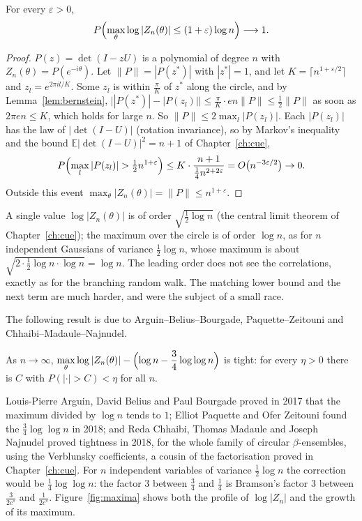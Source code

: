\begin{theorem}\label{thm:maxupper}
For every $\varepsilon>0$,
\[
P\Bigl(\max_\theta\log|Z_n(\theta)|\le(1+\varepsilon)\log n\Bigr)\longrightarrow1 .
\]
\end{theorem}

\begin{proof}
$P(z)=\det(I-zU)$ is a polynomial of degree $n$ with $Z_n(\theta)=P(e^{-i\theta})$. Let $\|P\|=|P(z^*)|$ with $|z^*|=1$, and let $K=\lceil n^{1+\varepsilon/2}\rceil$ and $z_l=e^{2\pi il/K}$. Some $z_l$ is within $\frac\pi K$ of $z^*$ along the circle, and by
Lemma~\ref{lem:bernstein}, $\bigl||P(z^*)|-|P(z_l)|\bigr|\le\frac\pi K\cdot en\|P\|\le\frac12\|P\|$ as soon as $2\pi en\le K$, which holds for large $n$. So $\|P\|\le2\max_l|P(z_l)|$. Each $|P(z_l)|$ has the law of $|\det(I-U)|$ (rotation
invariance), so by Markov's inequality and the bound $\mathbb E|\det(I-U)|^2=n+1$ of Chapter~\ref{ch:cue},
\[
P\Bigl(\max_l|P(z_l)|>\tfrac12n^{1+\varepsilon}\Bigr)\le K\cdot\frac{n+1}{\frac14n^{2+2\varepsilon}}=O\bigl(n^{-3\varepsilon/2}\bigr)\to0 .
\]
Outside this event $\max_\theta|Z_n(\theta)|=\|P\|\le n^{1+\varepsilon}$.
\end{proof}

A single value $\log|Z_n(\theta)|$ is of order $\sqrt{\frac12\log n}$ (the central limit theorem of Chapter~\ref{ch:cue}); the maximum over the circle is of order $\log n$, as for $n$ independent Gaussians of variance $\frac12\log n$, whose maximum is about
$\sqrt{2\cdot\frac12\log n\cdot\log n}=\log n$. The leading order does not see the correlations, exactly as for the branching random walk. The matching lower bound and the next term are much harder, and were the subject of a
small race.

The following result is due to Arguin--Belius--Bourgade, Paquette--Zeitouni and Chhaibi--Madaule--Najnudel.
\begin{theorem}[admitted]\label{thm:cuemax}
As $n\to\infty$, $\displaystyle\max_\theta\log|Z_n(\theta)|-\Bigl(\log n-\frac34\log\log n\Bigr)$ is tight: for every $\eta>0$ there is $C$ with $P(|\cdot|>C)<\eta$ for all $n$.
\end{theorem}

Louis-Pierre Arguin, David Belius and Paul Bourgade proved in 2017 that the maximum divided by $\log n$ tends to $1$; Elliot Paquette and Ofer Zeitouni found the $\frac34\log\log n$ in 2018; and Reda Chhaibi, Thomas Madaule and Joseph
Najnudel proved tightness in 2018, for the whole family of circular $\beta$-ensembles, using the Verblunsky coefficients, a cousin of the factorisation proved in Chapter~\ref{ch:cue}. For $n$ independent variables of variance $\frac12\log n$ the
correction would be $\frac14\log\log n$: the factor $3$ between $\frac34$ and $\frac14$ is Bramson's factor $3$ between $\frac3{2c^*}$ and $\frac1{2c^*}$. Figure~\ref{fig:maxima} shows both the profile of $\log|Z_n|$ and the growth of its maximum.

